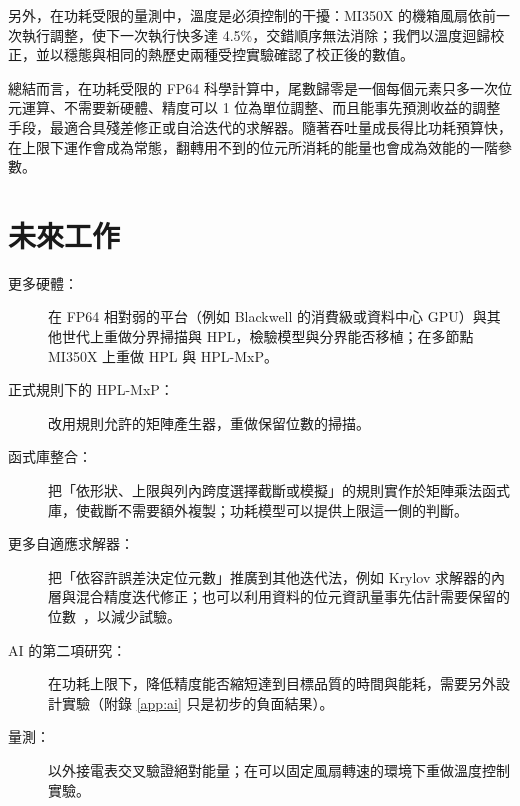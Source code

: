 \begin{enumerate}
\end{enumerate}

另外，在功耗受限的量測中，溫度是必須控制的干擾：MI350X 的機箱風扇依前一次執行調整，使下一次執行快多達 4.5\%，交錯順序無法消除；我們以溫度迴歸校正，並以穩態與相同的熱歷史兩種受控實驗確認了校正後的數值。

總結而言，在功耗受限的 FP64 科學計算中，尾數歸零是一個每個元素只多一次位元運算、不需要新硬體、精度可以 1 位為單位調整、而且能事先預測收益的調整手段，最適合具殘差修正或自洽迭代的求解器。隨著吞吐量成長得比功耗預算快，在上限下運作會成為常態，翻轉用不到的位元所消耗的能量也會成為效能的一階參數。

\section{未來工作}\label{sec:future}

\begin{description}
  \item[更多硬體：] 在 FP64 相對弱的平台（例如 Blackwell 的消費級或資料中心 GPU）與其他世代上重做分界掃描與 HPL，檢驗模型與分界能否移植；在多節點 MI350X 上重做 HPL 與 HPL-MxP。
  \item[正式規則下的 HPL-MxP：] 改用規則允許的矩陣產生器，重做保留位數的掃描。
  \item[函式庫整合：] 把「依形狀、上限與列內跨度選擇截斷或模擬」的規則實作於矩陣乘法函式庫，使截斷不需要額外複製；功耗模型可以提供上限這一側的判斷。
  \item[更多自適應求解器：] 把「依容許誤差決定位元數」推廣到其他迭代法，例如 Krylov 求解器的內層與混合精度迭代修正；也可以利用資料的位元資訊量事先估計需要保留的位數~\cite{Klower2021}，以減少試驗。
  \item[AI 的第二項研究：] 在功耗上限下，降低精度能否縮短達到目標品質的時間與能耗，需要另外設計實驗（附錄 \ref{app:ai} 只是初步的負面結果）。
  \item[量測：] 以外接電表交叉驗證絕對能量；在可以固定風扇轉速的環境下重做溫度控制實驗。
\end{description}
